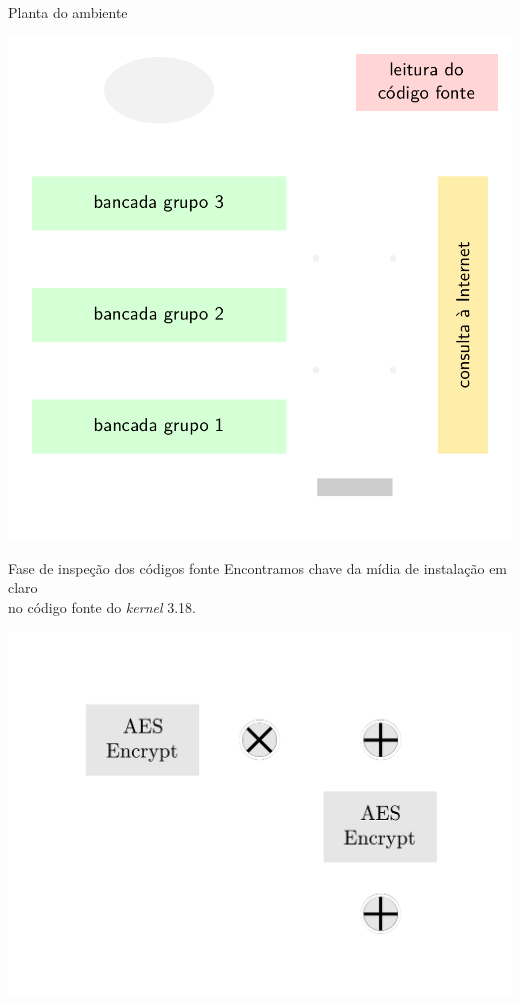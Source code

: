 \documentclass[10pt,xcolor={dvipsnames}]{beamer}
\begin{document}
\begin{frame}{Planta do ambiente}
  \begin{center}
  \includegraphics[width=\textwidth,height=0.8\textheight,keepaspectratio]{planta}
  \end{center}
\end{frame}


\begin{frame}{Fase de inspeção dos códigos fonte}
  Encontramos chave da mídia de instalação em claro \\no código fonte do \textit{kernel} 3.18.
  \vfill
  \begin{center}
  \includegraphics[width=\textwidth,height=0.5\textheight,keepaspectratio]{aes-xts-sec.pdf}
  \end{center}
\end{frame}
\end{document}
